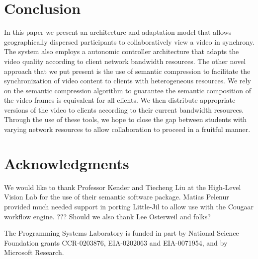 \documentclass{sig-alternate}
\begin{document}
\section{Conclusion}

In this paper we present an architecture and adaptation model that
allows geographically dispersed participants to collaboratively view a
video in synchrony.  The system also employs a autonomic controller
architecture that adapts the video quality according to client network
bandwidth resources.  The other novel approach that we put present is
the use of semantic compression to facilitate the synchronization of
video content to clients with heterogeneous resources.  We rely on the
semantic compression algorithm to guarantee the semantic composition
of the video frames is equivalent for all clients.  We then distribute
appropriate versions of the video to clients according to their
current bandwidth resources.  Through the use of these tools, we hope
to close the gap between students with varying network resources to
allow collaboration to proceed in a fruitful manner.

\section{Acknowledgments}
We would like to thank Professor Kender and Tiecheng Liu at the
High-Level Vision Lab for the use of their semantic software package.
Matias Pelenur provided much needed support in porting Little-Jil to
allow use with the Cougaar workflow engine.  ??? Should we also thank
Lee Osterweil and folks?

The Programming Systems Laboratory is funded in part by National
Science Foundation grants CCR-0203876, EIA-0202063 and EIA-0071954,
and by Microsoft Research.

 

% 
\end{document}
